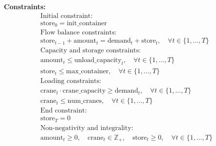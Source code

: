 \documentclass{article}
\begin{document}
\textbf{Constraints:}
\begin{align*}
& \text{Initial constraint:} & \\
& \text{store}_{0} = \text{init\_container} \\
& \text{Flow balance constraints:} & \\
& \text{store}_{t-1} + \text{amount}_{t} = \text{demand}_{t} + \text{store}_{t}, \quad \forall t \in \{1, \ldots, T\} \\
& \text{Capacity and storage constraints:} & \\
& \text{amount}_{t} \leq \text{unload\_capacity}_{t}, \quad \forall t \in \{1, \ldots, T\} \\
& \text{store}_{t} \leq \text{max\_container}, \quad \forall t \in \{1, \ldots, T\} \\
& \text{Loading constraints:} & \\
& \text{crane}_{t} \cdot \text{crane\_capacity} \geq \text{demand}_{t}, \quad \forall t \in \{1, \ldots, T\} \\
& \text{crane}_{t} \leq \text{num\_cranes}, \quad \forall t \in \{1, \ldots, T\} \\
& \text{End constraint:} & \\
& \text{store}_{T} = 0 \\
& \text{Non-negativity and integrality:} & \\
& \text{amount}_{t} \geq 0, \quad \text{crane}_{t} \in \mathbb{Z}_{+}, \quad \text{store}_{t} \geq 0, \quad \forall t \in \{1, \ldots, T\}
\end{align*}
\end{document}
